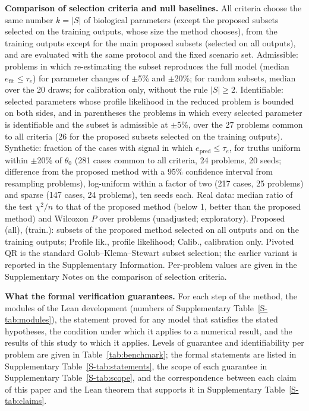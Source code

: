 \documentclass[pdflatex,sn-nature]{sn-jnl}
\theoremstyle{plain}
\begin{document}
\begin{table}[!htbp]
\caption{\textbf{Comparison of selection criteria and null baselines.} All criteria choose the same number $k=|S|$ of biological parameters (except the proposed subsets selected on the training outputs, whose size the method chooses), from the training outputs except for the main proposed subsets (selected on all outputs), and are evaluated with the same protocol and the fixed scenario set. Admissible: problems in which re-estimating the subset reproduces the full model (median $e_{\mathrm{fit}}\le\tau_e$) for parameter changes of $\pm$5\% and $\pm$20\%; for random subsets, median over the 20 draws; for calibration only, without the rule $|S|\ge2$. Identifiable: selected parameters whose profile likelihood in the reduced problem is bounded on both sides, and in parentheses the problems in which every selected parameter is identifiable and the subset is admissible at $\pm$5\%, over the 27 problems common to all criteria (26 for the proposed subsets selected on the training outputs). Synthetic: fraction of the cases with signal in which $e_{\mathrm{pred}}\le\tau_e$, for truths uniform within $\pm$20\% of $\theta_0$ (281 cases common to all criteria, 24 problems, 20 seeds; difference from the proposed method with a 95\% confidence interval from resampling problems), log-uniform within a factor of two (217 cases, 25 problems) and sparse (147 cases, 24 problems), ten seeds each. Real data: median ratio of the test $\chi^2/n$ to that of the proposed method (below 1, better than the proposed method) and Wilcoxon $P$ over problems (unadjusted; exploratory). Proposed (all), (train.): subsets of the proposed method selected on all outputs and on the training outputs; Profile lik., profile likelihood; Calib., calibration only. Pivoted QR is the standard Golub--Klema--Stewart subset selection; the earlier variant is reported in the Supplementary Information. Per-problem values are given in the Supplementary Notes on the comparison of selection criteria.}
\label{tab:comparison}
\centering
\scriptsize
\setlength{\tabcolsep}{1.1pt}

\end{table}
\clearpage
\begin{table}[!htbp]
\caption{\textbf{What the formal verification guarantees.} For each step of the method, the modules of the Lean development (numbers of Supplementary Table~\ref{S-tab:modules}), the statement proved for any model that satisfies the stated hypotheses, the condition under which it applies to a numerical result, and the results of this study to which it applies. Levels of guarantee and identifiability per problem are given in Table~\ref{tab:benchmark}; the formal statements are listed in Supplementary Table~\ref{S-tab:statements}, the scope of each guarantee in Supplementary Table~\ref{S-tab:scope}, and the correspondence between each claim of this paper and the Lean theorem that supports it in Supplementary Table~\ref{S-tab:claims}.}
\label{tab:lean}
\centering
\scriptsize

\end{table}
\clearpage
\end{document}
